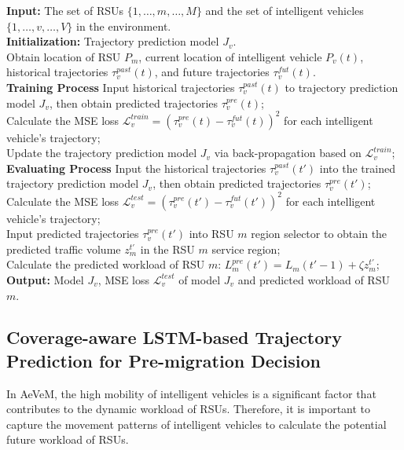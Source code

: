 \documentclass[lettersize,journal]{IEEEtran}
\begin{document}
\begin{algorithm}[t]
\caption{Coverage-aware LSTM-based Trajectory Prediction.}\label{alg:lstm}
\begin{algorithmic} 
\STATE 
\STATE \textbf{Input:} The set of RSUs ${\{1,\dots,m,\dots,M\}}$ and the set of intelligent vehicles ${\{1,\dots, v,\dots,V\}}$ in the environment.\\
\STATE \textbf{Initialization:} Trajectory prediction model $J_{v}$.\\
Obtain location of RSU $P_{m}$, current location of intelligent vehicle $P_{v}(t)$, historical trajectories $\tau_{v}^{past}(t)$, and future trajectories $\tau_{v}^{fut}(t)$.\\
\STATE \textbf{Training Process}
\STATE Input historical trajectories $\tau_{v}^{past}(t)$ to trajectory prediction model $J_{v}$, then obtain predicted trajectories $\tau_{v}^{pre}(t)$;\\
\STATE Calculate the MSE loss $\mathcal{L}_{v}^{train} = (\tau_v^{pre}(t)-\tau_v^{fut}(t))^2$ for each intelligent vehicle's trajectory;\\
\STATE Update the trajectory prediction model $J_{v}$ via back-propagation based on $\mathcal{L}_{v}^{train}$;\\
\ENDFOR
\STATE \textbf{Evaluating Process}
\STATE Input the historical trajectories $\tau_{v}^{past}(t')$ into the trained trajectory prediction model $J_{v}$, then obtain predicted trajectories $\tau_{v}^{pre}(t')$;\\
\STATE Calculate the MSE loss $\mathcal{L}_{v}^{test} = (\tau_v^{pre}(t')-\tau_v^{fut}(t'))^2$ for each intelligent vehicle's trajectory;\\
\STATE Input predicted trajectories $\tau_{v}^{pre}(t')$ into RSU $m$ region selector to obtain the predicted traffic volume $z_m^{t'}$ in the RSU $m$ service region;\\
\STATE Calculate the predicted workload of RSU $m$: $L_m^{pre}(t')= L_m(t'-1) + \zeta z_m^{t'}$;\\
\ENDFOR
\STATE \textbf{Output:} Model $J_{v}$, MSE loss $\mathcal{L}_{v}^{test}$ of model $J_{v}$ and predicted workload of RSU $m$.
\end{algorithmic}
\label{alg1}
\end{algorithm}

\subsection{Coverage-aware LSTM-based Trajectory Prediction for Pre-migration Decision}
In AeVeM, the high mobility of intelligent vehicles is a significant factor that contributes to the dynamic workload of RSUs. Therefore, it is important to capture the movement patterns of intelligent vehicles to calculate the potential future workload of RSUs.
\end{document}

